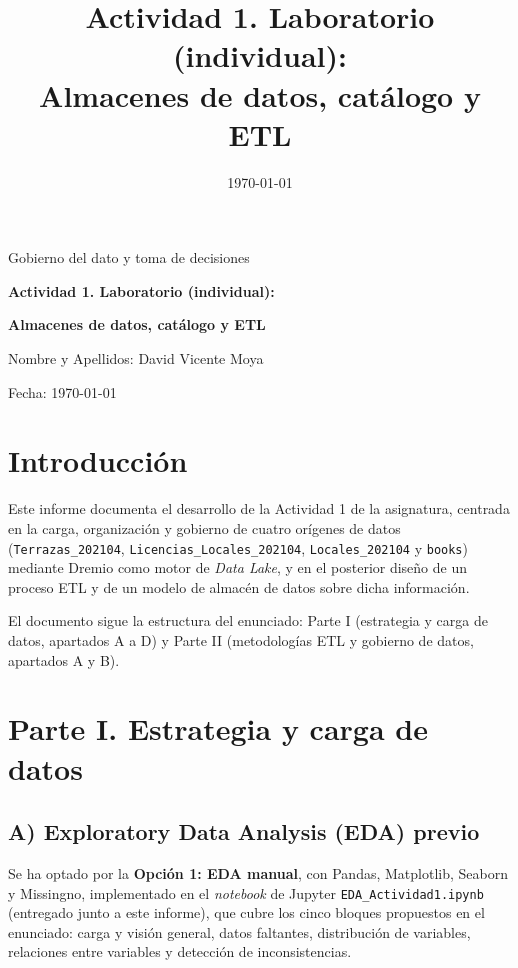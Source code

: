 \documentclass[11pt]{article}
\title{\textbf{Actividad 1. Laboratorio (individual):\\ Almacenes de datos, catálogo y ETL}}
\date{\today}
\begin{document}
\begin{titlepage}
    \centering
    \vspace*{2cm}
    {\Large Gobierno del dato y toma de decisiones\par}
    \vspace{2cm}
    {\Huge\bfseries Actividad 1. Laboratorio (individual):\par}
    {\Huge\bfseries Almacenes de datos, catálogo y ETL\par}
    \vspace{3cm}
    {\large Nombre y Apellidos: David Vicente Moya\par}
    \vspace{1cm}
    {\large Fecha: \today \par}
    \vfill
\end{titlepage}

\tableofcontents
\newpage

\section{Introducción}

Este informe documenta el desarrollo de la Actividad 1 de la asignatura, centrada en la
carga, organización y gobierno de cuatro orígenes de datos (\texttt{Terrazas\_202104},
\texttt{Licencias\_Locales\_202104}, \texttt{Locales\_202104} y \texttt{books}) mediante
Dremio como motor de \emph{Data Lake}, y en el posterior diseño de un proceso ETL y de un
modelo de almacén de datos sobre dicha información.

El documento sigue la estructura del enunciado: Parte I (estrategia y carga de datos,
apartados A a D) y Parte II (metodologías ETL y gobierno de datos, apartados A y B).

\section{Parte I. Estrategia y carga de datos}

\subsection{A) Exploratory Data Analysis (EDA) previo}

Se ha optado por la \textbf{Opción 1: EDA manual}, con Pandas, Matplotlib, Seaborn y
Missingno, implementado en el \emph{notebook} de Jupyter \texttt{EDA\_Actividad1.ipynb}
(entregado junto a este informe), que cubre los cinco bloques propuestos en el enunciado:
carga y visión general, datos faltantes, distribución de variables, relaciones entre
variables y detección de inconsistencias.
\end{document}
